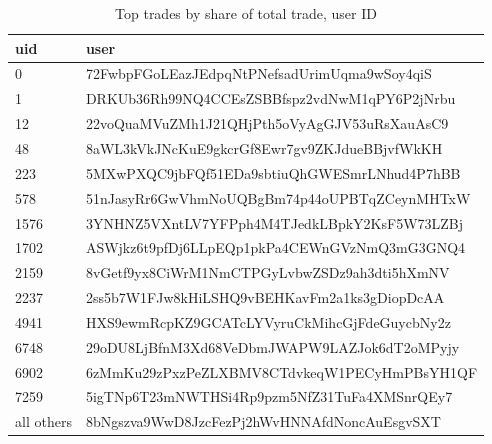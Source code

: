 \documentclass[]{scrartcl}
\begin{document}
	\begin{table}[]\scriptsize{
			\begin{tabular}{@{}ll@{}}
				\toprule
				uid        & user                                         \\ \midrule
				0          & 72FwbpFGoLEazJEdpqNtPNefsadUrimUqma9wSoy4qiS \\
				1          & DRKUb36Rh99NQ4CCEsZSBBfspz2vdNwM1qPY6P2jNrbu \\
				12         & 22voQuaMVuZMh1J21QHjPth5oVyAgGJV53uRsXauAsC9 \\
				48         & 8aWL3kVkJNcKuE9gkcrGf8Ewr7gv9ZKJdueBBjvfWkKH \\
				223        & 5MXwPXQC9jbFQf51EDa9sbtiuQhGWESmrLNhud4P7hBB \\
				578        & 51nJasyRr6GwVhmNoUQBgBm74p44oUPBTqZCeynMHTxW \\
				1576       & 3YNHNZ5VXntLV7YFPph4M4TJedkLBpkY2KsF5W73LZBj \\
				1702       & ASWjkz6t9pfDj6LLpEQp1pkPa4CEWnGVzNmQ3mG3GNQ4 \\
				2159       & 8vGetf9yx8CiWrM1NmCTPGyLvbwZSDz9ah3dti5hXmNV \\
				2237       & 2ss5b7W1FJw8kHiLSHQ9vBEHKavFm2a1ks3gDiopDcAA \\
				4941       & HXS9ewmRcpKZ9GCATcLYVyruCkMihcGjFdeGuycbNy2z \\
				6748       & 29oDU8LjBfnM3Xd68VeDbmJWAPW9LAZJok6dT2oMPyjy \\
				6902       & 6zMmKu29zPxzPeZLXBMV8CTdvkeqW1PECyHmPBsYH1QF \\
				7259       & 5igTNp6T23mNWTHSi4Rp9pzm5NfZ31TuFa4XMSnrQEy7 \\
				all others & 8bNgszva9WwD8JzcFezPj2hWvHNNAfdNoncAuEsgvSXT \\ \bottomrule
			\end{tabular}
			\caption{Top trades by share of total trade, user ID\label{tab:trbp_uid}}
		}
	\end{table}
	
	
	
\end{document}

